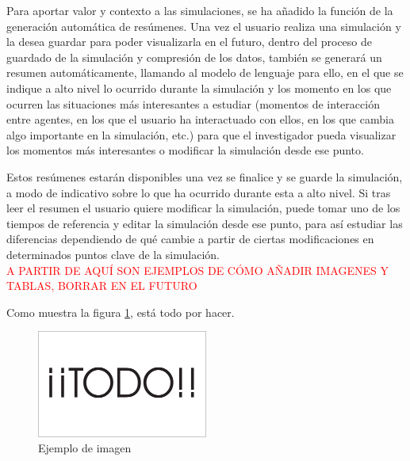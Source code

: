 Para aportar valor y contexto a las simulaciones, se ha añadido la función de la generación automática de resúmenes. Una vez el usuario realiza una simulación y la desea guardar para poder visualizarla en el futuro, dentro del proceso de guardado de la simulación y compresión de los datos, también se generará un resumen automáticamente, llamando al modelo de lenguaje para ello, en el que se indique a alto nivel lo ocurrido durante la simulación y los momento en los que ocurren las situaciones más interesantes a estudiar (momentos de interacción entre agentes, en los que el usuario ha interactuado con ellos, en los que cambia algo importante en la simulación, etc.) para que el investigador pueda visualizar los momentos más interesantes o modificar la simulación desde ese punto.

Estos resúmenes estarán disponibles una vez se finalice y se guarde la simulación, a modo de indicativo sobre lo que ha ocurrido durante esta a alto nivel. Si tras leer el resumen el usuario quiere modificar la simulación, puede tomar uno de los tiempos de referencia y editar la simulación desde ese punto, para así estudiar las diferencias dependiendo de qué cambie a partir de ciertas modificaciones en determinados puntos clave de la simulación.\\




























\textcolor{red}{A PARTIR DE AQUÍ SON EJEMPLOS DE CÓMO AÑADIR IMAGENES Y TABLAS, BORRAR EN EL FUTURO}


Como muestra la figura \ref{fig:sampleImage}, está todo por hacer.

\begin{figure}[h]
	\centering
	\includegraphics[width = 0.5\textwidth]{Imagenes/Vectorial/Todo.pdf}
	\caption{Ejemplo de imagen}
	\label{fig:sampleImage}
\end{figure}

